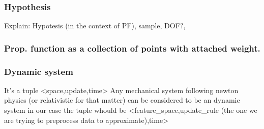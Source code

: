\subsubsection{Hypothesis}
Explain: Hypotesis (in the context of PF), sample, DOF?, 

\subsubsection{Prop. function as a collection of points with attached weight.}


\subsubsection{Dynamic system}
    It's a tuple <space,update,time>
    Any mechanical system following newton physics (or relativistic for that matter) can be considered to be an dynamic system
    in our case the tuple whould be <feature\_space,update\_rule (the one we are trying to preprocess data to approximate),time>



